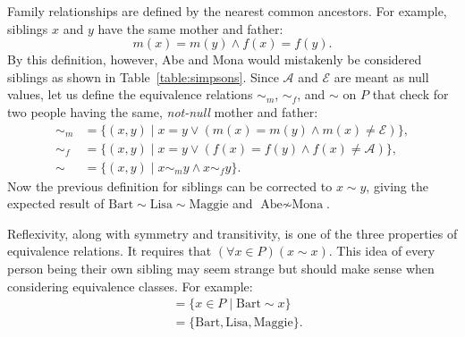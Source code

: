 \documentclass[letterpaper]{article}
\begin{document}
Family relationships are defined by the nearest common ancestors.
For example, siblings \(x\) and \(y\) have the same mother and father:
\[
    m(x) = m(y) \land f(x) = f(y).
\]
By this definition, however, Abe and Mona would mistakenly be considered siblings as shown in Table~\ref{table:simpsons}.
Since \(\mathcal{A}\) and \(\mathcal{E}\) are meant as null values, let us define the equivalence relations \({\sim_m}\), \({\sim_f}\), and \({\sim}\) on \(P\) that check for two people having the same, \textit{not-null} mother and father:
\begin{align*}
    {\sim_m} & = \{(x, y) \mid x = y \lor (m(x) = m(y) \land m(x) \neq \mathcal{E})\}, \\
    {\sim_f} & = \{(x, y) \mid x = y \lor (f(x) = f(y) \land f(x) \neq \mathcal{A})\}, \\
    {\sim}   & = \{(x, y) \mid x \sim_m y \land x \sim_f y\}.
\end{align*}
Now the previous definition for siblings can be corrected to \(x \sim y\), giving the expected result of \(\text{Bart} \sim \text{Lisa} \sim \text{Maggie}\) and \(\text{Abe} \nsim \text{Mona}\).

Reflexivity, along with symmetry and transitivity, is one of the three properties of equivalence relations.
It requires that \((\forall x \in P)(x \sim x)\).
This idea of every person being their own sibling may seem strange but should make sense when considering equivalence classes.
For example:
\begin{align*}
    [\text{Bart}] & = \{x \in P \mid \text{Bart} \sim x\}          \\
                  & = \{\text{Bart}, \text{Lisa}, \text{Maggie}\}.
\end{align*}
\end{document}
